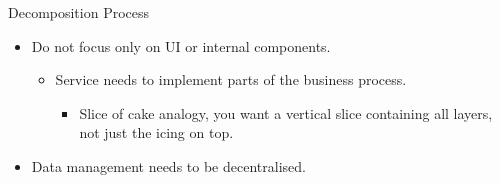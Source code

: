 \documentclass{slide}
\begin{document}
\begin{frame}{Decomposition Process}
{\begin{itemize}[<+->]
{\begin{itemize}
                 \item Do not focus only on UI or internal components.
                 \begin{itemize}
                     \Large\item Service needs to implement  parts of the business process.
                     \begin{itemize}
                         \Large\item Slice of cake analogy, you want a vertical slice containing all layers,
                                     not just the icing on top.
                     \end{itemize}
                 \end{itemize}
                 \vspace{3mm}
                 \item Data management needs to be decentralised.
             \end{itemize}
            }
\end{itemize}
}
\end{frame}
\end{document}
